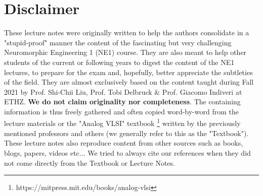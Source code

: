 \documentclass[main]{subfiles}
\begin{document}
\section*{Disclaimer}
These lecture notes were originally written to help the authors consolidate in a "stupid-proof" manner the content of the fascinating but very challenging Neuromorphic Engineering 1 (NE1) course. They are also meant to help other students of the current or following years to digest the content of the NE1 lectures, to prepare for the exam and, hopefully,  better appreciate the subtleties of the field. They are almost exclusively based on the content taught during Fall 2021 by Prof. Shi-Chii Liu, Prof. Tobi Delbruck \& Prof. Giacomo Indiveri at ETHZ. \textbf{We do not claim originality nor completeness}. The containing information is thus freely gathered and often copied word-by-word from the lecture materials or the "Analog VLSI" textbook \footnote{https://mitpress.mit.edu/books/analog-vlsi} written by the previously mentioned professors and others (we generally refer to this as the "Textbook"). These lecture notes also reproduce content from other sources such as books, blogs, papers, videos etc... We tried to always cite our references when they did not come directly from the Textbook or Lecture Notes.  
\end{document}
